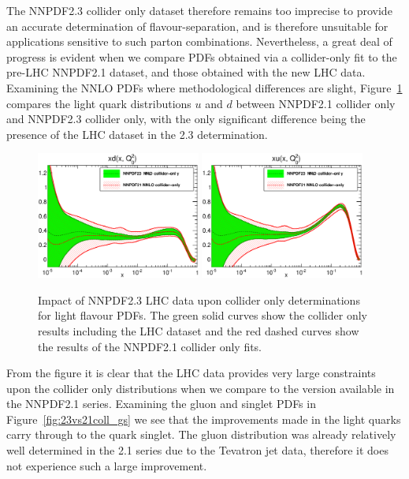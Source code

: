 The NNPDF2.3 collider only dataset therefore remains too imprecise to provide an accurate determination of flavour-separation, and is therefore unsuitable for applications sensitive to such parton combinations. Nevertheless, a great deal of progress is evident when we compare PDFs obtained via a collider-only fit to the pre-LHC NNPDF2.1 dataset, and those obtained with the new LHC data. Examining the NNLO PDFs where methodological differences are slight, Figure~\ref{fig:23vs21coll_lqs} compares the light quark distributions $u$ and $d$ between NNPDF2.1 collider only and NNPDF2.3 collider only, with the only significant difference being the presence of the LHC dataset in the 2.3 determination.


\begin{figure}[h]
\centering
\includegraphics[width=0.48\textwidth]{6-LHCimpact/figs/pdf_xd_log_band_comparison.eps}
\includegraphics[width=0.48\textwidth]{6-LHCimpact/figs/pdf_xu_log_band_comparison.eps}
\caption[Impact of NNPDF2.3 LHC data upon collider only determinations for light flavour PDFs]{Impact of NNPDF2.3 LHC data upon collider only determinations for light flavour PDFs. The green solid curves show the collider only results including the LHC dataset and the red dashed curves show the results of the NNPDF2.1 collider only fits.}
\label{fig:23vs21coll_lqs}
\end{figure}

From the figure it is clear that the LHC data provides very large constraints upon the collider only distributions when we compare to the version available in the NNPDF2.1 series. Examining the gluon and singlet PDFs in Figure~\ref{fig:23vs21coll_gs} we see that the improvements made in the light quarks carry through to the quark singlet. The gluon distribution was already relatively well determined in the 2.1 series due to the Tevatron jet data, therefore it does not experience such a large improvement. 

